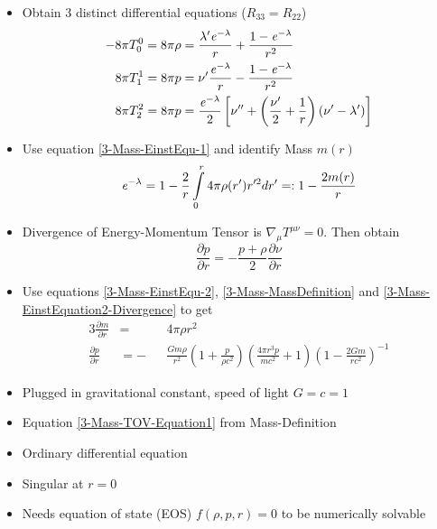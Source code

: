 \begin{frame}
	\begin{itemize}[<+->]
		\item Obtain 3 distinct differential equations ($R_{33}=R_{22}$)
		\begin{align}
			-8\pi T_0^0 = 8\pi\rho &= \frac{\lambda'\mathit{e}^{-\lambda}}{r}+\frac{1-\mathit{e}^{-\lambda}}{r^2}\label{3-Mass-EinstEqu-1}\\
			8\pi T_1^1 = 8\pi p &= \nu'\frac{\mathit{e}^{-\lambda}}{r} - \frac{1-\mathit{e}^{-\lambda}}{r^2}\label{3-Mass-EinstEqu-2}\\
			8\pi T_2^2 = 8\pi p &= \frac{\mathit{e}^{-\lambda}}{2}\left[\nu''+\left(\frac{\nu'}{2} + \frac{1}{r}\right)\left(\nu'-\lambda'\right) \right]\label{3-Mass-EinstEqu-3}
		\end{align}
		\item Use equation \ref{3-Mass-EinstEqu-1} and identify Mass $m(r)$
		\begin{equation}
			\mathit{e}^{-\lambda}=1-\frac{2}{r}\int\limits_0^r 4\pi\rho(r')r'^2dr' =: 1-\frac{2m(r)}{r} 
			\label{3-Mass-MassDefinition}
		\end{equation}
		\item Divergence of Energy-Momentum Tensor is $\nabla_{\mu}T^{\mu\nu}=0$. Then obtain
		\begin{equation}
			\frac{\partial p}{\partial r} = -\frac{p+\rho}{2}\frac{\partial \nu}{\partial r}
			\label{3-Mass-EinstEquation2-Divergence}
		\end{equation}
	\end{itemize}
\end{frame}

\begin{frame}
	\begin{itemize}[<+->]
		\item Use equations \ref{3-Mass-EinstEqu-2}, \ref{3-Mass-MassDefinition} and \ref{3-Mass-EinstEquation2-Divergence} to get
		\begin{alignat}{3}
			\frac{\partial m}{\partial r} &= &&4\pi\rho r^2\label{3-Mass-TOV-Equation1}\\
			\frac{\partial p}{\partial r} &= -&&\frac{Gm\rho}{r^2}\left(1+\frac{p}{\rho c^2}\right)\left(\frac{4\pi r^3p}{mc^2}+1\right)\left(1-\frac{2Gm}{rc^2}\right)^{-1}\label{3-Mass-TOV-Equation2}
		\end{alignat}
		\item Plugged in gravitational constant, speed of light $G=c=1$
		\item Equation \ref{3-Mass-TOV-Equation1} from Mass-Definition
		\item Ordinary differential equation
		\item Singular at $r=0$
		\item Needs equation of state (EOS) $f(\rho,p,r)=0$ to be numerically solvable
	\end{itemize}
\end{frame}

